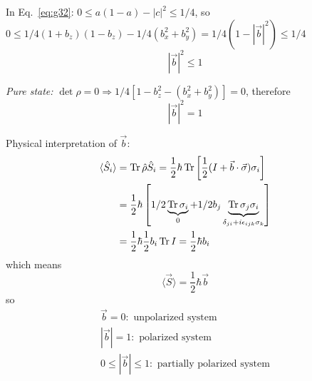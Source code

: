 \documentclass[12pt]{article}
\newcommand{\be}{\begin{equation}}
\newcommand{\ee}{\end{equation}}
\begin{document}
In Eq.~\eqref{eq:g32}: $0 \leqslant a(1-a)-|c|^{2} \leqslant 1 / 4$, so
$0 \leq 1 / 4\left(1+b_{z}\right)\left(1-b_{z}\right)-1 / 4\left(b_{x}^{2}+b_{y}^{2}\right)
= 1/4 (1 - |\vec{b}|^2) \leqslant 1/4$
\be
\boxed{
|\vec{b}|^2 \leqslant 1 
}
\ee


\emph{Pure state:} $\operatorname{det} \rho=0 \Rightarrow 1 / 4\left[1-b_{z}^{2}-\left(b_{x}^{2}+b_{y}^{2}\right)\right]=0$, therefore
\be
\boxed{
|\vec{b}|^2 = 1 
}
\ee

Physical interpretation of $\vec{b}$:
\be
\begin{aligned}
\langle\hat{S}_i\rangle &
= \Tr \hat{\rho} \hat{S}_i = \frac{1}{2} \hbar \Tr
\left[
 \frac{1}{2} (I + \vec{b}\cdot\vec{\sigma}) \sigma_i
\right]\\
&=\frac{1}{2} \hbar\left[1 / 2 \underbrace{\Tr \sigma_{i}}_0
+1 / 2 b_{j} \underbrace{\Tr \sigma_{j} \sigma_{i}}%
_{\delta_{ji} + i \epsilon_{ijk}\sigma_k}
\right]\\
&=\frac{1}{2} \hbar \frac{1}{2} b_{i} \Tr I=\frac{1}{2} \hbar b_{i}
\end{aligned}
\ee
which means
\be
\boxed{
\langle\vec{S}\rangle = \frac{1}{2} \hbar \vec{b}
}
\ee
so
\[
\begin{gathered}
\vec{b} = 0: \text{ unpolarized system} \\
|\vec{b}| = 1: \text{ polarized system} \\
0 \leqslant |\vec{b}| \leqslant 1: \text{ partially polarized system}
\end{gathered}
\]
\end{document}
